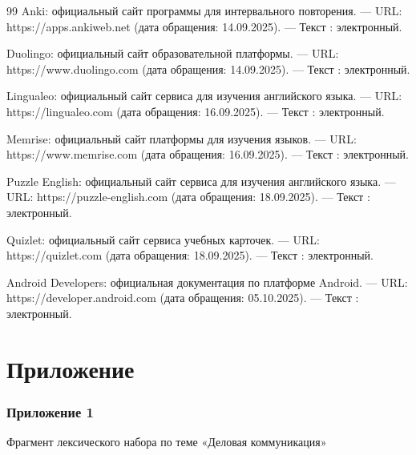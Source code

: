 \documentclass[11pt,a4paper,openany]{report}
\begin{document}
\begin{thebibliography}{99}
\bibitem{} Anki: официальный сайт программы для интервального повторения. — URL: https://apps.ankiweb.net (дата обращения: 14.09.2025). — Текст : электронный.

\bibitem{} Duolingo: официальный сайт образовательной платформы. — URL: https://www.duolingo.com (дата обращения: 14.09.2025). — Текст : электронный.

\bibitem{} Lingualeo: официальный сайт сервиса для изучения английского языка. — URL: https://lingualeo.com (дата обращения: 16.09.2025). — Текст : электронный.

\bibitem{} Memrise: официальный сайт платформы для изучения языков. — URL: https://www.memrise.com (дата обращения: 16.09.2025). — Текст : электронный.

\bibitem{} Puzzle English: официальный сайт сервиса для изучения английского языка. — URL: https://puzzle-english.com (дата обращения: 18.09.2025). — Текст : электронный.

\bibitem{} Quizlet: официальный сайт сервиса учебных карточек. — URL: https://quizlet.com (дата обращения: 18.09.2025). — Текст : электронный.

\bibitem{} Android Developers: официальная документация по платформе Android. — URL: https://developer.android.com (дата обращения: 05.10.2025). — Текст : электронный.

\end{thebibliography}

\chapter*{Приложение}

\subsection*{Приложение 1}

Фрагмент лексического набора по теме «Деловая коммуникация»
\end{document}
